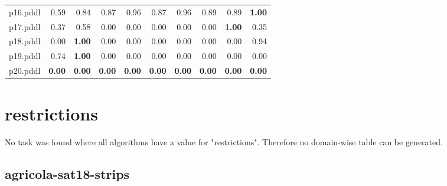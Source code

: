 \documentclass{article}
\begin{document}
\begin{tabular}{@{}lrrrrrrrrr@{}}
p16.pddl & 0.59 & 0.84 & 0.87 & 0.96 & 0.87 & 0.96 & 0.89 & 0.89 & \textbf{1.00} \\
p17.pddl & 0.37 & 0.58 & 0.00 & 0.00 & 0.00 & 0.00 & 0.00 & \textbf{1.00} & 0.35 \\
p18.pddl & 0.00 & \textbf{1.00} & 0.00 & 0.00 & 0.00 & 0.00 & 0.00 & 0.00 & 0.94 \\
p19.pddl & 0.74 & \textbf{1.00} & 0.00 & 0.00 & 0.00 & 0.00 & 0.00 & 0.00 & 0.00 \\
p20.pddl & \textbf{0.00} & \textbf{0.00} & \textbf{0.00} & \textbf{0.00} & \textbf{0.00} & \textbf{0.00} & \textbf{0.00} & \textbf{0.00} & \textbf{0.00} \\
\end{tabular}

\hypertarget{restrictions}{}
\section*{restrictions}

No task was found where all algorithms have a value for "restrictions". Therefore no domain-wise table can be generated.

\hypertarget{restrictions-agricola-sat18-strips}{}
\subsection*{agricola-sat18-strips}
\end{document}
